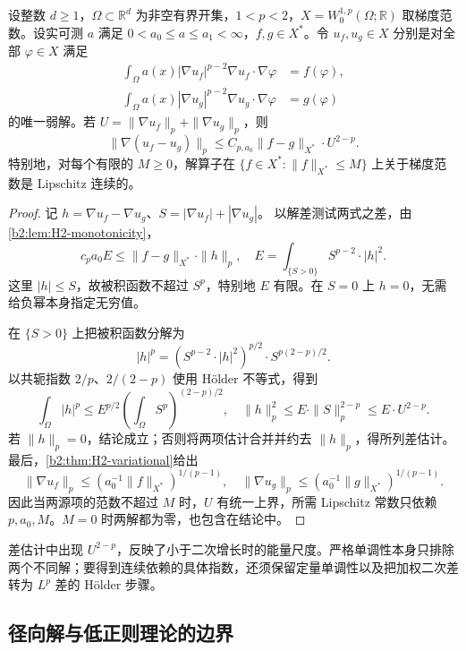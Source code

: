 \begin{proposition}[奇异范围的源项稳定性]
\label{b2:prop:H2-subquadratic-stability}
设整数 \(d\ge1\)，\(\Omega\subset\mathbb R^d\) 为非空有界开集，\(1<p<2\)，\(X=W_0^{1,p}(\Omega;\mathbb R)\) 取梯度范数。设实可测 \(a\) 满足 \(0<a_0\le a\le a_1<\infty\)，\(f,g\in X^*\)。令 \(u_f,u_g\in X\) 分别是对全部 \(\varphi\in X\) 满足
\[
 \begin{aligned}
 \int_\Omega a(x)|\nabla u_f|^{p-2}\nabla u_f\cdot\nabla\varphi&=f(\varphi),\\
 \int_\Omega a(x)|\nabla u_g|^{p-2}\nabla u_g\cdot\nabla\varphi&=g(\varphi)
 \end{aligned}
\]
的唯一弱解。若 \(U=\|\nabla u_f\|_p+\|\nabla u_g\|_p\)，则
\[
 \|\nabla(u_f-u_g)\|_p
 \le C_{p,a_0}\|f-g\|_{X^*}\cdot U^{2-p}.
\]
特别地，对每个有限的 \(M\ge0\)，解算子在 \(\{f\in X^*: \|f\|_{X^*}\le M\}\) 上关于梯度范数是 Lipschitz 连续的。
\end{proposition}
\begin{proof}
记 \(h=\nabla u_f-\nabla u_g\)、\(S=|\nabla u_f|+|\nabla u_g|\)。
以解差测试两式之差，由\cref{b2:lem:H2-monotonicity}，
\[
 c_pa_0E\le\|f-g\|_{X^*}\cdot\|h\|_p,
 \quad E=\int_{\{S>0\}}S^{p-2}\cdot|h|^2.
\]
这里 \(|h|\le S\)，故被积函数不超过 \(S^p\)，特别地 \(E\) 有限。在 \(S=0\) 上 \(h=0\)，无需给负幂本身指定无穷值。

在 \(\{S>0\}\) 上把被积函数分解为
\[
 |h|^p=(S^{p-2}\cdot|h|^2)^{p/2}\cdot S^{p(2-p)/2}.
\]
以共轭指数 \(2/p\)、\(2/(2-p)\) 使用 Hölder 不等式，得到
\[
 \int_\Omega|h|^p
 \le E^{p/2}\left(\int_\Omega S^p\right)^{(2-p)/2},
 \quad \|h\|_p^2\le E\cdot\|S\|_p^{2-p}\le E\cdot U^{2-p}.
\]
若 \(\|h\|_p=0\)，结论成立；否则将两项估计合并并约去 \(\|h\|_p\)，得所列差估计。最后，\cref{b2:thm:H2-variational}给出
\[
 \|\nabla u_f\|_p\le(a_0^{-1}\|f\|_{X^*})^{1/(p-1)},
 \quad
 \|\nabla u_g\|_p\le(a_0^{-1}\|g\|_{X^*})^{1/(p-1)}.
\]
因此当两源项的范数不超过 \(M\) 时，\(U\) 有统一上界，所需 Lipschitz 常数只依赖 \(p,a_0,M\)。\(M=0\) 时两解都为零，也包含在结论中。
\end{proof}

差估计中出现 \(U^{2-p}\)，反映了小于二次增长时的能量尺度。严格单调性本身只排除两个不同解；要得到连续依赖的具体指数，还须保留定量单调性以及把加权二次差转为 \(L^p\) 差的 Hölder 步骤。

\subsection{径向解与低正则理论的边界}
\label{b2:subsec:H20204}

